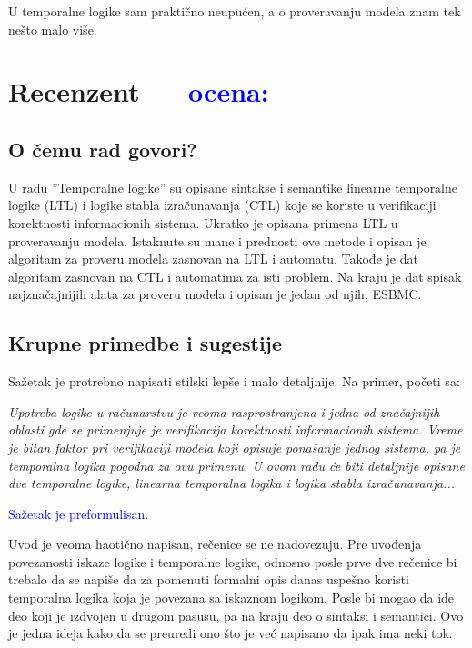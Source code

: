 \documentclass[a4paper]{report}
\newcommand{\odgovor}[1]{\textcolor{blue}{#1}}
\begin{document}
U temporalne logike sam praktično neupućen, a o proveravanju modela znam tek nešto malo više.

\chapter{Recenzent \odgovor{--- ocena:} }


\section{O čemu rad govori?}

U radu ''Temporalne logike'' su opisane sintakse i semantike linearne temporalne logike (LTL) i logike stabla izračunavanja (CTL) koje se koriste u verifikaciji korektnosti informacionih sistema. Ukratko je opisana primena LTL u proveravanju modela. Istaknute su mane i prednosti ove metode i opisan je algoritam za proveru modela zasnovan na LTL i automatu. Takođe je dat algoritam zasnovan na CTL i automatima za isti problem. Na kraju je dat spisak najznačajnijih alata za proveru modela i opisan je jedan od njih, ESBMC.

\section{Krupne primedbe i sugestije}

Sažetak je protrebno napisati stilski lepše i malo detaljnije. Na primer, početi sa:

\textit{Upotreba logike u računarstvu je veoma rasprostranjena i jedna od značajnijih oblasti gde se primenjuje je verifikacija korektnosti informacionih sistema. Vreme je bitan faktor pri verifikaciji modela koji opisuje ponašanje jednog sistema, pa je temporalna logika pogodna za ovu primenu. U ovom radu će biti detaljnije opisane dve temporalne logike, linearna temporalna logika i logika stabla izračunavanja...}

\odgovor{Sažetak je preformulisan.}

Uvod je veoma haotično napisan, rečenice se ne nadovezuju. Pre uvođenja povezanosti iskaze logike i temporalne logike, odnosno posle prve dve rečenice bi trebalo da se napiše da za pomenuti formalni opis danas uspešno koristi temporalna logika koja je povezana sa iskaznom logikom. Posle bi mogao da ide deo koji je izdvojen u drugom pasusu, pa na kraju deo o sintaksi i semantici. Ovo je jedna ideja kako da se preuredi ono što je već napisano da ipak ima neki tok.
\end{document}
